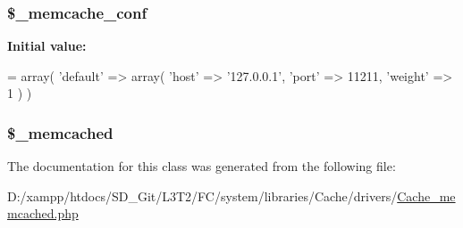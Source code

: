 \subsubsection[{\$\+\_\+memcache\+\_\+conf}]{\setlength{\rightskip}{0pt plus 5cm}\$\+\_\+memcache\+\_\+conf\hspace{0.3cm}{\ttfamily [protected]}}\label{class_c_i___cache__memcached_a31577b029b5c3ce5002b0d30ac01b261}
{\bfseries Initial value\+:}
\begin{DoxyCode}
= array(
        \textcolor{stringliteral}{'default'} => array(
            \textcolor{stringliteral}{'host'}      => \textcolor{stringliteral}{'127.0.0.1'},
            \textcolor{stringliteral}{'port'}      => 11211,
            \textcolor{stringliteral}{'weight'}    => 1
        )
    )
\end{DoxyCode}
\hypertarget{class_c_i___cache__memcached_a9ce5188201bbc41ed4374947a35dadcc}{}
\subsubsection[{\$\+\_\+memcached}]{\setlength{\rightskip}{0pt plus 5cm}\$\+\_\+memcached\hspace{0.3cm}{\ttfamily [protected]}}\label{class_c_i___cache__memcached_a9ce5188201bbc41ed4374947a35dadcc}


The documentation for this class was generated from the following file\+:\begin{DoxyCompactItemize}
\item 
D\+:/xampp/htdocs/\+S\+D\+\_\+\+Git/\+L3\+T2/\+F\+C/system/libraries/\+Cache/drivers/\hyperlink{_cache__memcached_8php}{Cache\+\_\+memcached.\+php}\end{DoxyCompactItemize}
